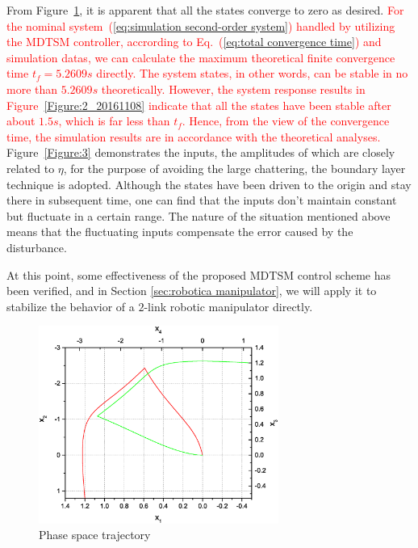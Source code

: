 \documentclass[3p]{elsarticle}
\theoremstyle{plain}
\theoremstyle{remark}
\begin{document}
From Figure~\ref{Figure:2}, it is apparent that all the states converge to zero as desired. \textcolor{red}{For the nominal system~(\ref{eq:simulation second-order system}) handled by utilizing the MDTSM controller, accrording to Eq.~(\ref{eq:total convergence time}) and simulation datas, we can calculate the maximum theoretical finite convergence time $t_f=5.2609s$ directly. The system states, in other words, can be stable in no more than $5.2609s$ theoretically. However, the system response results in Figure~\ref{Figure:2_20161108} indicate that all the states have been stable after about $1.5s$, which is far less than $t_f$. Hence, from the view of the convergence time, the simulation results are in accordance with the theoretical analyses.} Figure~\ref{Figure:3} demonstrates the inputs, the amplitudes of which are closely related to $\eta$, for the purpose of avoiding the large chattering, the boundary layer technique is adopted. Although the states have been driven to the origin and stay there in subsequent time, one can find that the inputs don't maintain constant but fluctuate in a certain range. The nature of the situation mentioned above means that the fluctuating inputs compensate the error caused by the disturbance.\par

At this point, some effectiveness of the proposed MDTSM control scheme has been verified, and in Section \ref{sec:robotica manipulator}, we will apply it to stabilize the behavior of a $2$-link robotic manipulator directly.
\begin{figure}[http]
\centering
\includegraphics[width=0.7\textwidth]{paper3_fig2.eps}
\caption{Phase space trajectory}
\label{Figure:2}
\end{figure}
\end{document}
